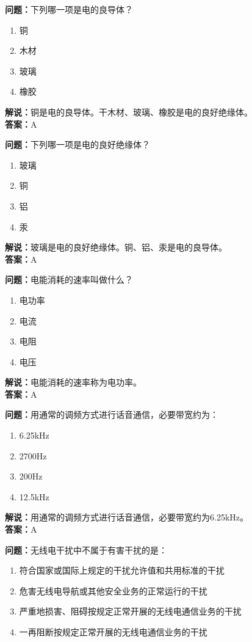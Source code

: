 \documentclass[UTF8]{ctexbook}
\begin{document}
\textbf{问题：}下列哪一项是电的良导体？
\begin{enumerate}[label=\Alph*), leftmargin=3em]
  \item 铜
  \item 木材
  \item 玻璃
  \item 橡胶
\end{enumerate}
\textbf{解说：}铜是电的良导体。干木材、玻璃、橡胶是电的良好绝缘体。\\
\textbf{答案：}A

\textbf{问题：}下列哪一项是电的良好绝缘体？
\begin{enumerate}[label=\Alph*), leftmargin=3em]
  \item 玻璃
  \item 铜
  \item 铝
  \item 汞
\end{enumerate}
\textbf{解说：}玻璃是电的良好绝缘体。铜、铝、汞是电的良导体。\\
\textbf{答案：}A

\textbf{问题：}电能消耗的速率叫做什么？
\begin{enumerate}[label=\Alph*), leftmargin=3em]
  \item 电功率
  \item 电流
  \item 电阻
  \item 电压
\end{enumerate}
\textbf{解说：}电能消耗的速率称为电功率。\\
\textbf{答案：}A

\textbf{问题：}用通常的调频方式进行话音通信，必要带宽约为：
\begin{enumerate}[label=\Alph*), leftmargin=3em]
  \item 6.25kHz
  \item 2700Hz
  \item 200Hz
  \item 12.5kHz
\end{enumerate}
\textbf{解说：}用通常的调频方式进行话音通信，必要带宽约为6.25kHz。\\
\textbf{答案：}A

\textbf{问题：}无线电干扰中不属于有害干扰的是：
\begin{enumerate}[label=\Alph*), leftmargin=3em]
  \item 符合国家或国际上规定的干扰允许值和共用标准的干扰
  \item 危害无线电导航或其他安全业务的正常运行的干扰
  \item 严重地损害、阻碍按规定正常开展的无线电通信业务的干扰
  \item 一再阻断按规定正常开展的无线电通信业务的干扰
\end{enumerate}
\end{document}
